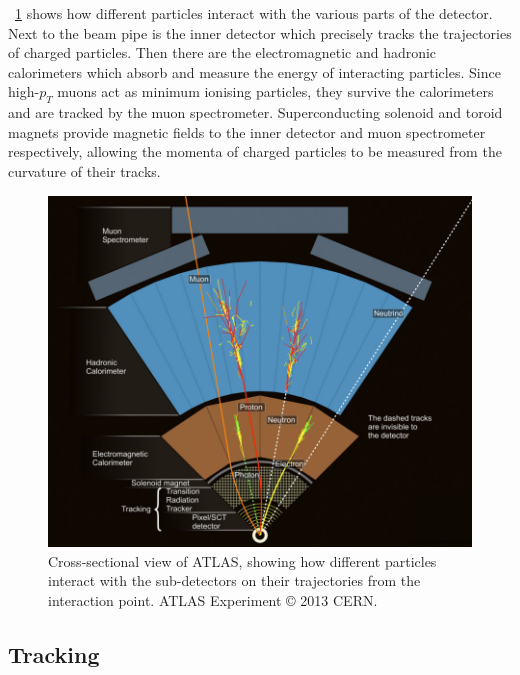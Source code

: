 \Figure~\ref{fig:atlas_wedge} shows how different particles interact with the various 
parts of the detector. Next to the beam pipe is the inner detector which precisely tracks 
the trajectories of charged particles. Then there are the electromagnetic and hadronic 
calorimeters which absorb and measure the energy of interacting particles. Since 
high-$p_T$ muons act as minimum ionising particles, they survive the calorimeters and are 
tracked by the muon spectrometer. Superconducting solenoid and toroid magnets provide 
magnetic fields to the inner detector and muon spectrometer respectively, allowing the 
momenta of charged particles to be measured from the curvature of their tracks.

\begin{figure}
	\includegraphics[width=\largefigwidth]{tex/experiment/atlas_wedge}
	\caption{Cross-sectional view of ATLAS, showing how different particles interact with 
	the sub-detectors on their trajectories from the interaction point. ATLAS Experiment 
	\copyright\xspace 2013 CERN.}
	\label{fig:atlas_wedge}
\end{figure}



\subsection{Tracking}
\label{sec:atlas:id}

